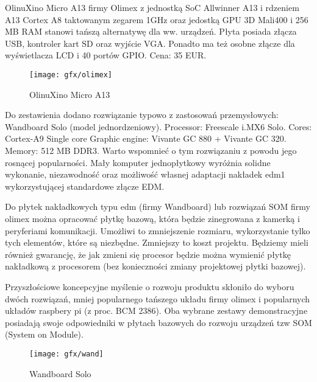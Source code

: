 OlinuXino Micro A13 firmy Olimex  z jednostką SoC Allwinner A13 i rdzeniem A13 Cortex A8 taktowanym zegarem 1GHz oraz jedostką GPU 3D Mali400 i 256 MB RAM stanowi tańszą alternatywę dla ww. urządzeń. Płyta posiada złącza USB, kontroler kart SD oraz wyjście VGA. Ponadto ma też osobne złącze dla wyświetlacza LCD i 40 portów GPIO. Cena: 35 EUR.

\begin{figure}[bth]
\centering
{\texttt{[image: gfx/olimex]}}
\caption[OlinuXino Micro A13]{OlinuXino Micro A13}
\label{fig:Chipscope}
\end{figure}

Do zestawienia dodano rozwiązanie typowo z zastosowań przemysłowych: Wandboard Solo (model jednordzeniowy). Processor: Freescale i.MX6 Solo. Cores: Cortex-A9 Single core 
Graphic engine: Vivante GC 880 + Vivante GC 320. Memory: 512 MB DDR3. Warto wspomnieć o tym rozwiązaniu z powodu jego rosnącej popularności. Mały komputer jednopłytkowy wyróżnia solidne wykonanie, niezawodność oraz możliwość własnej adaptacji nakładek edm1 wykorzystującej standardowe złącze EDM. 

Do płytek nakładkowych typu edm (firmy Wandboard) lub rozwiązań SOM firmy olimex można opracować płytkę bazową, która będzie zinegrowana z kamerką i peryferiami komunikacji. Umożliwi to zmniejszenie rozmiaru, wykorzystanie tylko tych elementów, które są niezbędne. Zmniejszy to koszt projektu. Będziemy mieli również gwarancję, że jak zmieni się procesor będzie można wymienić płytkę nakładkową z procesorem (bez konieczności zmiany projektowej płytki bazowej).

Przyszłościowe koncepcyjne myślenie o rozwoju produktu skłoniło do wyboru dwóch rozwiązań, mniej popularnego tańszego układu firmy olimex i popularnych układów raspbery pi (z proc. BCM 2386). Oba wybrane zestawy demonstracyjne posiadają swoje odpowiedniki w płytach bazowych do rozwoju urządzeń tzw SOM (System on Module).

\begin{figure}[bth]
\centering
{\texttt{[image: gfx/wand]}}
\caption[Wandboard]{Wandboard Solo}
\label{fig:Chipscope}
\end{figure}


